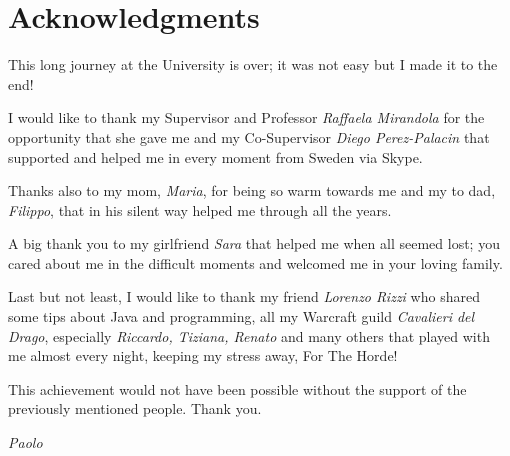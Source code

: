 \chapter*{Acknowledgments}

This long journey at the University is over; it was not easy but I made it to the end!

\vspace{0.5cm}

I would like to thank my Supervisor and Professor \emph{Raffaela Mirandola} for the opportunity that she gave me and my Co-Supervisor \emph{Diego Perez-Palacin} that supported and helped me in every moment from Sweden via Skype.

\vspace{0.5cm}

Thanks also to my mom, \emph{Maria}, for being so warm towards me and my to dad, \emph{Filippo}, that in his silent way helped me through all the years.

\vspace{0.5cm}

A big thank you to my girlfriend \emph{Sara} that helped me when all seemed lost; you cared about me in the difficult moments and welcomed me in your loving family.

\vspace{0.5cm}

Last but not least, I would like to thank my friend \emph{Lorenzo Rizzi} who shared some tips about Java and programming, all my Warcraft guild \emph{Cavalieri del Drago}, especially \emph{Riccardo, Tiziana, Renato} and many others that played with me almost every night, keeping my stress away, For The Horde!

\vspace{0.5cm}

This achievement would not have been possible without the support of the previously mentioned people. Thank you.

\begin{flushright}
	\emph{Paolo}
\end{flushright}
